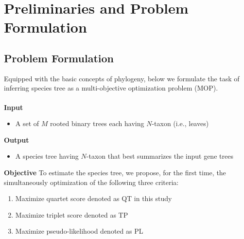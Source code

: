  \section{Preliminaries and Problem Formulation}



\subsection{Problem Formulation}
\label{sec:problem}
Equipped with the basic concepts of phylogeny, below we formulate the task of inferring species tree as a multi-objective optimization problem (MOP).\\\\
\textbf{Input}
\begin{itemize}
	\item A set of $M$ rooted binary trees each having $N$-taxon (i.e., leaves)
\end{itemize}
\textbf{Output}
\begin{itemize}
	\item A species tree having $N$-taxon that best summarizes the input gene trees
\end{itemize}
\textbf{Objective} To estimate the species tree, we propose, for the first time, the simultaneously optimization of the following three criteria:
\begin{enumerate}[label=$F_\arabic*$)]
	\item  Maximize quartet score denoted as QT in this study
	\item  Maximize triplet score denoted as TP 
	\item  Maximize pseudo-likelihood denoted as PL    
\end{enumerate}


